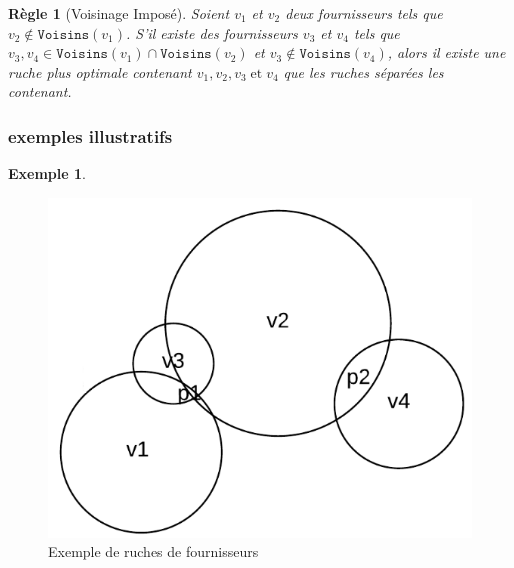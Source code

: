 \documentclass[a4paper,12pt]{report}
\theoremstyle{break}
\theoremstyle{break}
\theoremstyle{break}
\theoremstyle{break}
\newtheorem*{constraint}{Règle}
\theoremstyle{definition}
\newtheorem*{example}{Exemple}
\theoremstyle{remark}
\begin{document}
\begin{constraint}[Voisinage Imposé]
Soient $v_1$ et $v_2$ deux fournisseurs tels que $v_2 \notin \texttt{Voisins}(v_1)$. S'il existe des fournisseurs $v_3$ et $v_4$ tels que $v_3, v_4 \in \texttt{Voisins}(v_1) \cap \texttt{Voisins}(v_2)$ et $v_3 \notin \texttt{Voisins}(v_4)$, alors il existe une ruche plus optimale contenant $v_1, v_2, v_3\; \text{et}\; v_4$ que les ruches séparées les contenant.
\end{constraint}

\subsubsection{exemples illustratifs}
\begin{example}
\begin{figure}
  \centering
  \includegraphics[scale=0.3]{images/exemple_introductif1.png}
  \caption{Exemple de ruches de fournisseurs}
  \label{fig:exemple_introductif_1}
\end{figure}


\end{example}
\end{document}
